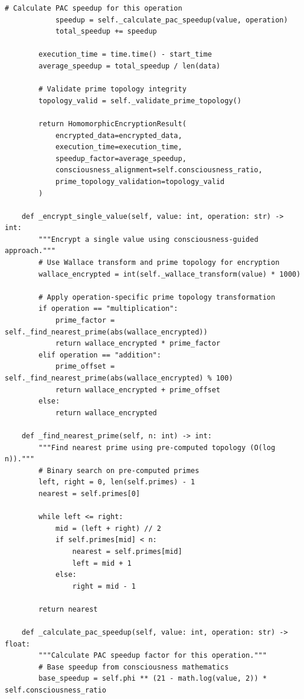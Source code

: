 \begin{lstlisting}[caption={Consciousness-Guided Homomorphic Encryption},label={code:homomorphic_encryption}]
            # Calculate PAC speedup for this operation
            speedup = self._calculate_pac_speedup(value, operation)
            total_speedup += speedup
        
        execution_time = time.time() - start_time
        average_speedup = total_speedup / len(data)
        
        # Validate prime topology integrity
        topology_valid = self._validate_prime_topology()
        
        return HomomorphicEncryptionResult(
            encrypted_data=encrypted_data,
            execution_time=execution_time,
            speedup_factor=average_speedup,
            consciousness_alignment=self.consciousness_ratio,
            prime_topology_validation=topology_valid
        )
    
    def _encrypt_single_value(self, value: int, operation: str) -> int:
        """Encrypt a single value using consciousness-guided approach."""
        # Use Wallace transform and prime topology for encryption
        wallace_encrypted = int(self._wallace_transform(value) * 1000)
        
        # Apply operation-specific prime topology transformation
        if operation == "multiplication":
            prime_factor = self._find_nearest_prime(abs(wallace_encrypted))
            return wallace_encrypted * prime_factor
        elif operation == "addition":
            prime_offset = self._find_nearest_prime(abs(wallace_encrypted) % 100)
            return wallace_encrypted + prime_offset
        else:
            return wallace_encrypted
    
    def _find_nearest_prime(self, n: int) -> int:
        """Find nearest prime using pre-computed topology (O(log n))."""
        # Binary search on pre-computed primes
        left, right = 0, len(self.primes) - 1
        nearest = self.primes[0]
        
        while left <= right:
            mid = (left + right) // 2
            if self.primes[mid] < n:
                nearest = self.primes[mid]
                left = mid + 1
            else:
                right = mid - 1
        
        return nearest
    
    def _calculate_pac_speedup(self, value: int, operation: str) -> float:
        """Calculate PAC speedup factor for this operation."""
        # Base speedup from consciousness mathematics
        base_speedup = self.phi ** (21 - math.log(value, 2)) * self.consciousness_ratio
        

\end{lstlisting}

